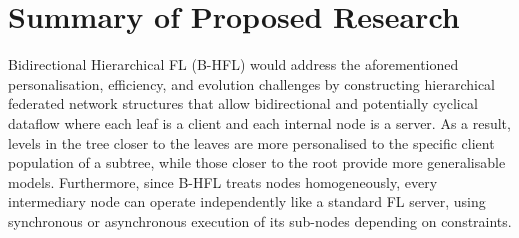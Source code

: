 \section{Summary of Proposed Research}
Bidirectional Hierarchical FL (B-HFL) would address the aforementioned personalisation, efficiency, and evolution challenges by constructing hierarchical federated network structures that allow bidirectional and potentially cyclical dataflow where each leaf is a client and each internal node is a server. As a result, levels in the tree closer to the leaves are more personalised to the specific client population of a subtree, while those closer to the root provide more generalisable models. Furthermore, since B-HFL treats nodes homogeneously, every intermediary node can operate independently like a standard FL server, using synchronous or asynchronous execution of its sub-nodes depending on constraints.

